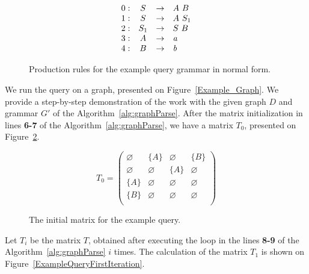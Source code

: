 \begin{figure}[h]
   \[
\begin{array}{rccl}
   0: & S & \rightarrow & A \ B \\
   1: & S & \rightarrow & A \ S_1 \\
   2: & S_1 & \rightarrow & S \ B \\
   3: & A & \rightarrow & \text{\emph{a}} \\ 
   4: & B & \rightarrow & \text{\emph{b}} \\ 
\end{array}
\]
\caption{Production rules for the example query grammar in normal form.}
\label{ProductionRulesExampleQueryCNF}
\end{figure}

We run the query on a graph, presented on Figure~\ref{Example_Graph}. We provide a step-by-step demonstration of the work with the given graph $D$ and grammar $G'$ of the Algorithm~\ref{alg:graphParse}. After the matrix initialization in lines \textbf{6-7} of the Algorithm~\ref{alg:graphParse}, we have a matrix $T_0$, presented on Figure~\ref{ExampleQueryInitMatrix}.

\begin{figure}[h]
\[
T_0 = \begin{pmatrix}
    \varnothing & \{A\}       & \varnothing & \{B\}       \\
    \varnothing & \varnothing & \{A\}       & \varnothing \\
    \{A\}       & \varnothing & \varnothing & \varnothing \\
    \{B\}       & \varnothing & \varnothing & \varnothing \\
\end{pmatrix}
\]
\caption{The initial matrix for the example query.}
\label{ExampleQueryInitMatrix}
\end{figure}

Let $T_i$ be the matrix $T$, obtained after executing the loop in the lines \textbf{8-9} of the Algorithm~\ref{alg:graphParse} $i$ times. The calculation of the matrix $T_1$ is shown on Figure~\ref{ExampleQueryFirstIteration}.

